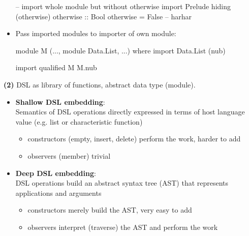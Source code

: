 \begin{itemize}
\begin{codebox}[haskell]
-- import whole module but without otherwise
import Prelude hiding (otherwise)
otherwise :: Bool
otherwise = False -- harhar
    \end{codebox}
    \item Pass imported modules to importer of own module:
    \begin{codebox}[haskell]
module M (..., module Data.List, ...) where
    import Data.List (nub)
    \end{codebox}
    \begin{codebox}[haskell]
import qualified M
    M.nub
    \end{codebox}
\end{itemize}



\vspace{2cm}

\textbf{(2)}
DSL as library of functions, abstract data type (module).
\begin{itemize}
    \item \textbf{Shallow DSL embedding}:\\
    Semantics of DSL operations directly expressed in terms of host language value (e.g. list or characteristic function)
    \begin{itemize}
        \item constructors (empty, insert, delete) perform the work, harder to add
        \item observers (member) trivial
    \end{itemize}
    \item \textbf{Deep DSL embedding}:\\
    DSL operations build an abstract syntax tree (AST) that represents applications and arguments
    \begin{itemize}
        \item constructors merely build the AST, very easy to add
        \item observers interpret (traverse) the AST and perform the work
    \end{itemize}

\end{itemize}

